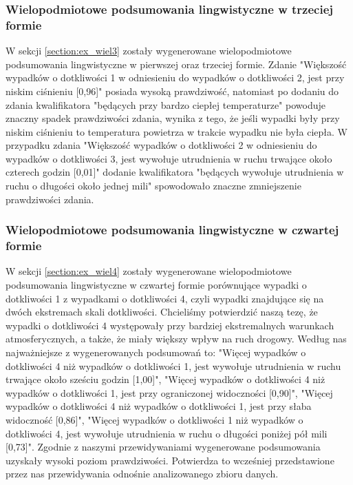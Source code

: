 \documentclass{classrep}
\begin{document}
\subsubsection{Wielopodmiotowe podsumowania lingwistyczne w trzeciej formie}

W sekcji \ref{section:ex_wiel3} zostały wygenerowane wielopodmiotowe podsumowania lingwistyczne w pierwszej oraz trzeciej formie. Zdanie "Większość wypadków o dotkliwości 1 w odniesieniu do wypadków o dotkliwości 2, jest przy niskim ciśnieniu [0,96]" posiada wysoką prawdziwość, natomiast po dodaniu do zdania kwalifikatora "będących przy bardzo ciepłej temperaturze" powoduje znaczny spadek prawdziwości zdania, wynika z tego, że jeśli wypadki były przy niskim ciśnieniu to temperatura powietrza w trakcie wypadku nie była ciepła. W przypadku zdania "Większość wypadków o dotkliwości 2 w odniesieniu do wypadków o dotkliwości 3, jest wywołuje utrudnienia w ruchu trwające około czterech godzin [0,01]" dodanie kwalifikatora "będących wywołuje utrudnienia w ruchu o długości około jednej mili" spowodowało znaczne zmniejszenie prawdziwości zdania. \\

\subsubsection{Wielopodmiotowe podsumowania lingwistyczne w czwartej formie}

W sekcji \ref{section:ex_wiel4} zostały wygenerowane wielopodmiotowe podsumowania lingwistyczne w czwartej formie porównujące wypadki o dotkliwości 1 z wypadkami o dotkliwości 4, czyli wypadki znajdujące się na dwóch ekstremach skali dotkliwości. Chcieliśmy potwierdzić naszą tezę, że wypadki o dotkliwości 4 występowały przy bardziej ekstremalnych warunkach atmosferycznych, a także, że miały większy wpływ na ruch drogowy. Według nas najważniejsze z wygenerowanych podsumowań to: "Więcej wypadków o dotkliwości 4 niż wypadków o dotkliwości 1, jest wywołuje utrudnienia w ruchu trwające około sześciu godzin [1,00]", "Więcej wypadków o dotkliwości 4 niż wypadków o dotkliwości 1, jest przy ograniczonej widoczności [0,90]", "Więcej wypadków o dotkliwości 4 niż wypadków o dotkliwości 1, jest przy słaba widoczność [0,86]", "Więcej wypadków o dotkliwości 1 niż wypadków o dotkliwości 4, jest wywołuje utrudnienia w ruchu o długości poniżej pół mili [0,73]". Zgodnie z naszymi przewidywaniami wygenerowane podsumowania uzyskały wysoki poziom prawdziwości. Potwierdza to wcześniej przedstawione przez nas przewidywania odnośnie analizowanego zbioru danych.
\end{document}
